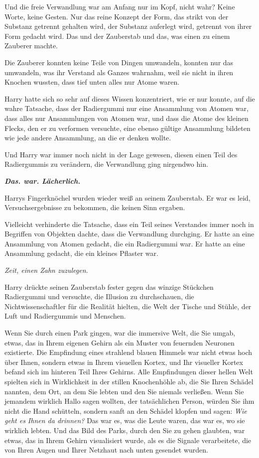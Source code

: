 Und die freie Verwandlung war am Anfang nur im Kopf, nicht wahr? Keine Worte,
keine Gesten. Nur das reine Konzept der Form, das strikt von der Substanz
getrennt gehalten wird, der Substanz auferlegt wird, getrennt von ihrer Form
gedacht wird. Das und der Zauberstab und das, was einen zu einem Zauberer
machte.

Die Zauberer konnten keine Teile von Dingen umwandeln, konnten nur das
umwandeln, was ihr Verstand als Ganzes wahrnahm, weil sie nicht in ihren Knochen
wussten, dass tief unten alles nur Atome waren.

Harry hatte sich so sehr auf dieses Wissen konzentriert, wie er nur konnte, auf
die wahre Tatsache, dass der Radiergummi nur eine Ansammlung von Atomen war,
dass alles nur Ansammlungen von Atomen war, und dass die Atome des kleinen
Flecks, den er zu verformen versuchte, eine ebenso gültige Ansammlung bildeten
wie jede andere Ansammlung, an die er denken wollte.

Und Harry war immer noch nicht in der Lage gewesen, diesen einen Teil des
Radiergummis zu verändern, die Verwandlung ging nirgendwo hin.

\textbf{\emph{Das. war. Lächerlich.}}

Harrys Fingerknöchel wurden wieder weiß an seinem Zauberstab. Er war es leid,
Versuchsergebnisse zu bekommen, die keinen Sinn ergaben.

Vielleicht verhinderte die Tatsache, dass ein Teil seines Verstandes immer noch
in Begriffen von Objekten dachte, dass die Verwandlung durchging. Er hatte an
eine Ansammlung von Atomen gedacht, die ein Radiergummi war. Er hatte an eine
Ansammlung gedacht, die ein kleines Pflaster war.

\emph{Zeit, einen Zahn zuzulegen.}

Harry drückte seinen Zauberstab fester gegen das winzige Stückchen Radiergummi
und versuchte, die Illusion zu durchschauen, die Nichtwissenschaftler für die
Realität hielten, die Welt der Tische und Stühle, der Luft und Radiergummis und
Menschen.

Wenn Sie durch einen Park gingen, war die immersive Welt, die Sie umgab, etwas,
das in Ihrem eigenen Gehirn als ein Muster von feuernden Neuronen existierte.
Die Empfindung eines strahlend blauen Himmels war nicht etwas hoch über Ihnen,
sondern etwas in Ihrem visuellen Kortex, und Ihr visueller Kortex befand sich im
hinteren Teil Ihres Gehirns. Alle Empfindungen dieser hellen Welt spielten sich
in Wirklichkeit in der stillen Knochenhöhle ab, die Sie Ihren Schädel nannten,
dem Ort, an dem Sie lebten und den Sie niemals verließen. Wenn Sie jemandem
wirklich Hallo sagen wollten, der tatsächlichen Person, würden Sie ihm nicht die
Hand schütteln, sondern sanft an den Schädel klopfen und sagen: \emph{\glqq{}Wie
geht es Ihnen da drinnen?\grqq{}} Das war es, was die Leute waren, das war es,
wo sie wirklich lebten. Und das Bild des Parks, durch den Sie zu gehen glaubten,
war etwas, das in Ihrem Gehirn visualisiert wurde, als es die Signale
verarbeitete, die von Ihren Augen und Ihrer Netzhaut nach unten gesendet wurden.

